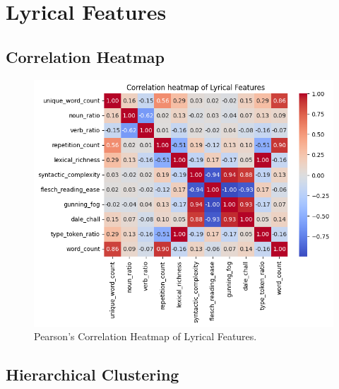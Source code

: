 

\section{Lyrical Features}

\subsection*{Correlation Heatmap}
\label{sec:correlationheatmapsspotifyfeatures}

\begin{center}
\begin{figure}[H]
  \centering
  \includegraphics[width=6in]{img/corr_heatmap_lyrical.png}
  \caption{Pearson's Correlation Heatmap of Lyrical Features.}
  \label{Figure:corr_heatmap_lyrical}
\end{figure}
\end{center}

\subsection*{Hierarchical Clustering}
\label{sec:hierarchicalclustering}

